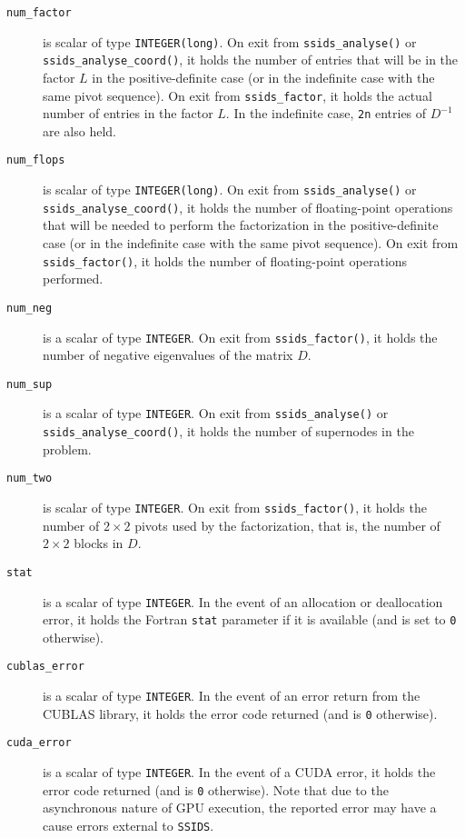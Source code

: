 \documentclass{spral}
\begin{document}
\begin{description}
\item[\texttt{num\_factor}] is scalar of type {\tt INTEGER(long)}. On exit from
{\tt ssids\_analyse()}  or {\tt ssids\_analyse\_coord()}, it holds the number of entries that will be in the
factor $L$ in the positive-definite case (or in the indefinite case with
the same pivot sequence). On exit from
{\tt ssids\_factor},
it holds the actual number of entries in the factor
$L$. In the indefinite case, {\tt 2n} entries of ${D}^{-1}$ are
also held.

\item[\texttt{num\_flops}] is scalar of type {\tt INTEGER(long)}. On exit from
{\tt ssids\_analyse()}  or {\tt ssids\_analyse\_coord()}, it holds the number of
floating-point operations that
will be needed to perform the factorization
in the positive-definite case (or in the indefinite case  with
the same pivot sequence).  On exit from {\tt ssids\_factor()}, it holds the
number of floating-point operations performed.

\item[\texttt{num\_neg}] is a scalar  of type  {\tt INTEGER}.
On exit from {\tt ssids\_factor()}, it holds
the number of negative eigenvalues of the matrix $D$.


\item[\texttt{num\_sup}] is a scalar of type  {\tt INTEGER}.
On exit from {\tt ssids\_analyse()}  or {\tt ssids\_analyse\_coord()}, it holds
the number of supernodes in the problem.

\item[\texttt{num\_two}] is scalar of type  {\tt INTEGER}.
On exit from
{\tt ssids\_factor()}, it holds the number
of $2 \times 2$ pivots used by the factorization, that is,
the number of $2 \times 2$ blocks in $D$.

\item[\texttt{stat}] is a scalar of type  {\tt INTEGER}.
In the event of an allocation or deallocation error, it
holds the Fortran {\tt stat} parameter if it is available
(and is set to {\tt 0} otherwise).

\item[\texttt{cublas\_error}] is a scalar of type {\tt INTEGER}.
In the event of an error return from the CUBLAS library, it
holds the error code returned (and is {\tt 0} otherwise).

\item[\texttt{cuda\_error}] is a scalar of type {\tt INTEGER}.
In the event of a CUDA error, it holds the error code returned (and is {\tt 0}
otherwise). Note that due to the asynchronous nature of GPU execution, the
reported error may have a cause errors external to {\tt SSIDS}.

\end{description}
\end{document}
